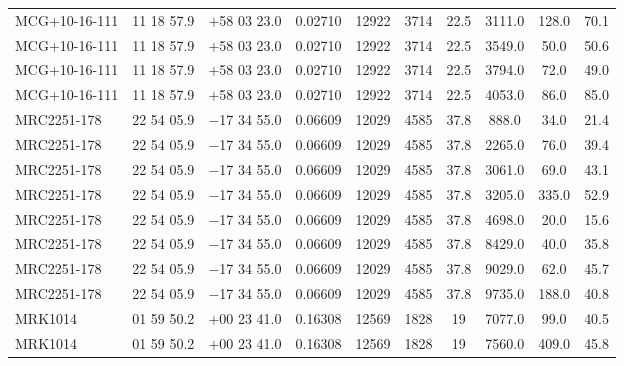 \begin{landscape}
\begin{center}
\begin{longtable}{l c c c c c c c c c}
MCG+10-16-111  &           11 18 57.9  &         $+$58 03 23.0  &       0.02710  & 12922  &   3714  &       22.5  &      3111.0  &  128.0  &  70.1  \\
MCG+10-16-111  &           11 18 57.9  &         $+$58 03 23.0  &       0.02710  & 12922  &   3714  &       22.5  &      3549.0  &  50.0  &   50.6  \\
MCG+10-16-111  &           11 18 57.9  &         $+$58 03 23.0  &       0.02710  & 12922  &   3714  &       22.5  &      3794.0  &  72.0  &   49.0  \\
MCG+10-16-111  &           11 18 57.9  &         $+$58 03 23.0  &       0.02710  & 12922  &   3714  &       22.5  &      4053.0  &  86.0  &   85.0  \\
MRC2251-178  &             22 54 05.9  &         $-$17 34 55.0  &       0.06609  & 12029  &   4585  &       37.8  &      888.0  &   34.0  &   21.4  \\
MRC2251-178  &             22 54 05.9  &         $-$17 34 55.0  &       0.06609  & 12029  &   4585  &       37.8  &      2265.0  &  76.0  &   39.4  \\
MRC2251-178  &             22 54 05.9  &         $-$17 34 55.0  &       0.06609  & 12029  &   4585  &       37.8  &      3061.0  &  69.0  &   43.1  \\
MRC2251-178  &             22 54 05.9  &         $-$17 34 55.0  &       0.06609  & 12029  &   4585  &       37.8  &      3205.0  &  335.0  &  52.9  \\
MRC2251-178  &             22 54 05.9  &         $-$17 34 55.0  &       0.06609  & 12029  &   4585  &       37.8  &      4698.0  &  20.0  &   15.6  \\
MRC2251-178  &             22 54 05.9  &         $-$17 34 55.0  &       0.06609  & 12029  &   4585  &       37.8  &      8429.0  &  40.0  &   35.8  \\
MRC2251-178  &             22 54 05.9  &         $-$17 34 55.0  &       0.06609  & 12029  &   4585  &       37.8  &      9029.0  &  62.0  &   45.7  \\
MRC2251-178  &             22 54 05.9  &         $-$17 34 55.0  &       0.06609  & 12029  &   4585  &       37.8  &      9735.0  &  188.0  &  40.8  \\
MRK1014  &                 01 59 50.2  &         $+$00 23 41.0  &       0.16308  & 12569  &   1828  &       19  &        7077.0  &  99.0  &   40.5  \\
MRK1014  &                 01 59 50.2  &         $+$00 23 41.0  &       0.16308  & 12569  &   1828  &       19  &        7560.0  &  409.0  &  45.8  \\

\end{longtable}
\end{center}
\end{landscape}
